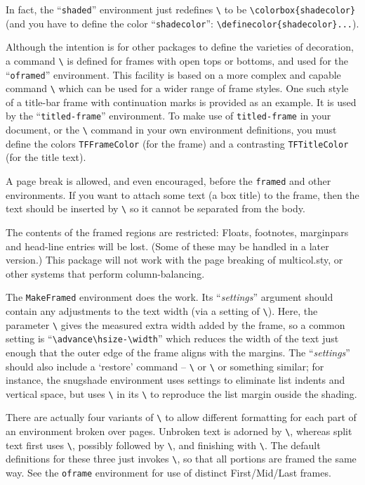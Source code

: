 \documentclass[DIV=8, pagesize=auto]{scrartcl}
\makeatletter
\newcommand*{\pkg}[1]{\textsf{#1}}
\newcommand*{\cs}[1]{\texttt{\textbackslash#1}}
\newcommand*{\cmd}[1]{\cs{\expandafter\@gobble\string#1}}
\newcommand*{\env}[1]{\texttt{#1}}
\newcommand*{\meta}[1]{\textlangle\textsl{#1}\textrangle}
\makeatother
\begin{document}
In fact, the ``\env{shaded}'' environment just redefines \cmd{\FrameCommand} to be
\verb+\colorbox{shadecolor}+ (and you have to define the color ``\texttt{shadecolor}'':
\verb+\definecolor{shadecolor}...+).

Although the intention is for other packages to define the varieties
of decoration, a command \cmd{\OpenFbox} is defined for frames with open 
tops or bottoms, and used for the ``\env{oframed}'' environment.  This 
facility is based on a more complex and capable command \cmd{\CustomFBox} which can
be used for a wider range of frame styles.  One such style of a title-bar
frame with continuation marks is provided as an example.  It is used by
the ``\env{titled-frame}'' environment.  To make use of \env{titled-frame} in your
document, or the \cmd{\TitleBarFrame} command in your own environment
definitions, you must define the colors \texttt{TFFrameColor} (for the frame)
and a contrasting \texttt{TFTitleColor} (for the title text).

A page break is allowed, and even encouraged, before the \env{framed}
and other environments.  If you want to attach some text (a box title) to the
frame, then the text should be inserted by \cmd{\FrameCommand} so it cannot
be separated from the body. 

The contents of the framed regions are restricted: 
Floats, footnotes, marginpars and head-line entries will be lost.
(Some of these may be handled in a later version.)
This package will not work with the page breaking of \pkg{multicol.sty},
or other systems that perform column-balancing.

The \env{MakeFramed} environment does the work.  Its ``\meta{settings}'' argument
should contain any adjustments to the text width (via a setting of \cmd{\hsize}).
Here, the parameter \cmd{\width} gives the measured extra width
added by the frame, so a common setting is ``\verb+\advance\hsize-\width+''
which reduces the width of the text just enough that the outer edge
of the frame aligns with the margins.  The ``\meta{settings}'' should also
include a `restore' command -- \cmd{\@parboxrestore} or \cmd{\FrameRestore}
or something similar; for instance, the snugshade environment uses
settings to eliminate list indents and vertical space, but uses
\cmd{\hspace} in its \cmd{\FrameCommand} to reproduce the list margin ouside the
shading.

There are actually four variants of \cmd{\FrameCommand} to allow different
formatting for each part of an environment broken over pages.  Unbroken
text is adorned by \cmd{\FrameCommand}, whereas split text first uses 
\cmd{\FirstFrameCommand}, possibly followed by \cmd{\MidFrameCommand}, and
finishing with \cmd{\LastFrameCommand}.  The default definitions for 
these three just invokes \cmd{\FrameCommand}, so that all portions are
framed the same way.  See the \env{oframe} environment for use of distinct
First/Mid/Last frames.
\end{document}
